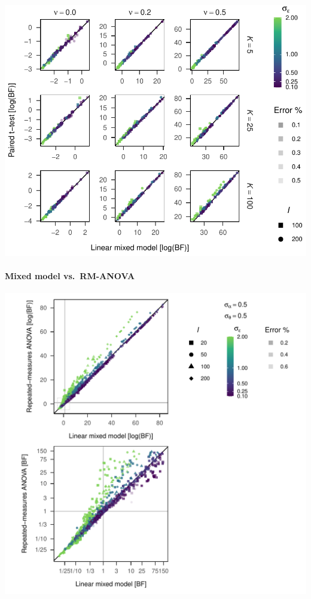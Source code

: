\documentclass[
  a4paper,
  DIV=11,
  numbers=noendperiod,
  oneside]{scrartcl}
\let\oldparagraph\paragraph
\renewcommand{\paragraph}[1]{\oldparagraph{#1}\mbox{}}
\begin{document}
\includegraphics{prior_translation_files/figure-pdf/simulation-results1-details-2.pdf}

\hypertarget{mixed-model-vs.-rm-anova}{%
\paragraph{Mixed model vs.~RM-ANOVA}\label{mixed-model-vs.-rm-anova}}

\includegraphics{prior_translation_files/figure-pdf/simulation-results2-1.pdf}
\end{document}
